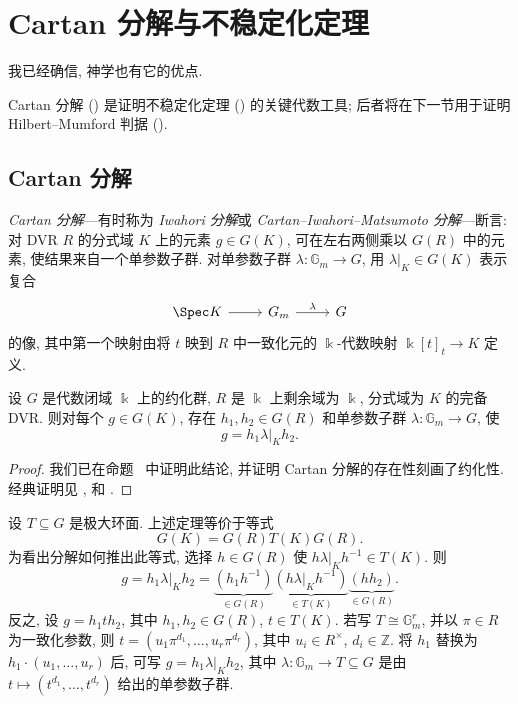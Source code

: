 \section{Cartan 分解与不稳定化定理}\label{src:8.3}
\begin{epigraph}
我已经确信, 神学也有它的优点.
\end{epigraph}
Cartan 分解 () 是证明不稳定化定理 () 的关键代数工具; 后者将在下一节用于证明 Hilbert--Mumford 判据 ().
\subsection{Cartan 分解}\label{src:8.3.1-subsection}
\textit{Cartan 分解}---有时称为 \textit{Iwahori 分解}或 \textit{Cartan--Iwahori--Matsumoto 分解}---断言: 对 DVR $R$ 的分式域 $K$ 上的元素 $g\in G(K)$, 可在左右两侧乘以 $G(R)$ 中的元素, 使结果来自一个单参数子群. 对单参数子群 $\lambda:\mathbb G_m\to G$, 用 $\lambda|_K\in G(K)$ 表示复合
\[
\begin{tikzcd}[ampersand replacement=\&]
\Spec K\arrow[r]\&\mathbb G_m\arrow[r,"\lambda"]\&G
\end{tikzcd}
\]
的像, 其中第一个映射由将 $t$ 映到 $R$ 中一致化元的 $\Bbbk$-代数映射 $\Bbbk[t]_t\to K$ 定义.
\begin{theorem}[Cartan 分解]\label{src:8.3.1}
设 $G$ 是代数闭域 $\Bbbk$ 上的约化群, $R$ 是 $\Bbbk$ 上剩余域为 $\Bbbk$, 分式域为 $K$ 的完备 DVR. 则对每个 $g\in G(K)$, 存在 $h_1,h_2\in G(R)$ 和单参数子群 $\lambda:\mathbb G_m\to G$, 使
\[
g=h_1\lambda|_Kh_2.
\]
\end{theorem}
\begin{proof}
我们已在命题~ 中证明此结论, 并证明 Cartan 分解的存在性刻画了约化性. 经典证明见 \cite[推论 2.17]{IM65}, \cite[定理 2.1]{Ses72} 和 \cite[\S4]{BT72}.
\end{proof}
\begin{remark}[等价表述]\label{src:8.3.2}
设 $T\subseteq G$ 是极大环面. 上述定理等价于等式
\[
G(K)=G(R)T(K)G(R).
\]
为看出分解如何推出此等式, 选择 $h\in G(R)$ 使 $h\lambda|_Kh^{-1}\in T(K)$. 则
\[
g=h_1\lambda|_Kh_2=\underbrace{(h_1h^{-1})}_{\in G(R)}\underbrace{(h\lambda|_Kh^{-1})}_{\in T(K)}\underbrace{(hh_2)}_{\in G(R)}.
\]
反之, 设 $g=h_1th_2$, 其中 $h_1,h_2\in G(R)$, $t\in T(K)$. 若写 $T\cong\mathbb G_m^r$, 并以 $\pi\in R$ 为一致化参数, 则 $t=(u_1\pi^{d_1},\ldots,u_r\pi^{d_r})$, 其中 $u_i\in R^\times$, $d_i\in\mathbb Z$. 将 $h_1$ 替换为 $h_1\cdot(u_1,\ldots,u_r)$ 后, 可写 $g=h_1\lambda|_Kh_2$, 其中 $\lambda:\mathbb G_m\to T\subseteq G$ 是由 $t\mapsto(t^{d_1},\ldots,t^{d_r})$ 给出的单参数子群.
\end{remark}
